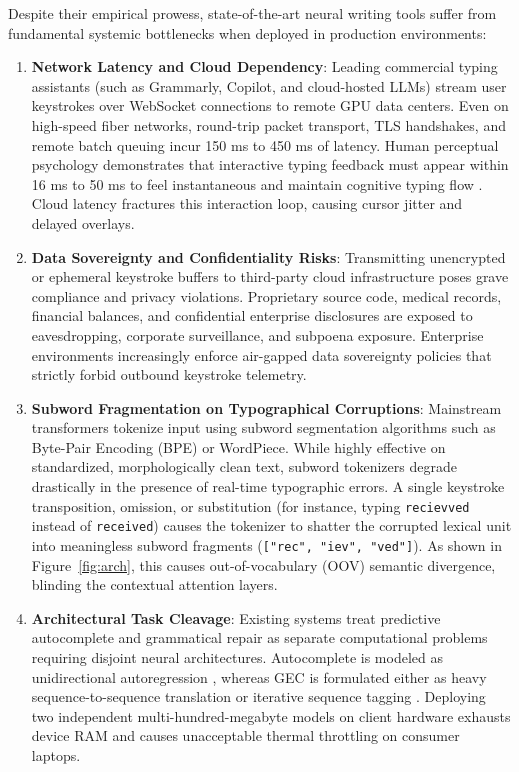 \documentclass[10pt,journal,compsoc]{IEEEtran}
\begin{document}
Despite their empirical prowess, state-of-the-art neural writing tools suffer from fundamental systemic bottlenecks when deployed in production environments:
\begin{enumerate}
    \item \textbf{Network Latency and Cloud Dependency}: Leading commercial typing assistants (such as Grammarly, Copilot, and cloud-hosted LLMs) stream user keystrokes over WebSocket connections to remote GPU data centers. Even on high-speed fiber networks, round-trip packet transport, TLS handshakes, and remote batch queuing incur 150 ms to 450 ms of latency. Human perceptual psychology demonstrates that interactive typing feedback must appear within 16 ms to 50 ms to feel instantaneous and maintain cognitive typing flow \cite{miller1968response}. Cloud latency fractures this interaction loop, causing cursor jitter and delayed overlays.
    \item \textbf{Data Sovereignty and Confidentiality Risks}: Transmitting unencrypted or ephemeral keystroke buffers to third-party cloud infrastructure poses grave compliance and privacy violations. Proprietary source code, medical records, financial balances, and confidential enterprise disclosures are exposed to eavesdropping, corporate surveillance, and subpoena exposure. Enterprise environments increasingly enforce air-gapped data sovereignty policies that strictly forbid outbound keystroke telemetry.
    \item \textbf{Subword Fragmentation on Typographical Corruptions}: Mainstream transformers tokenize input using subword segmentation algorithms such as Byte-Pair Encoding (BPE) \cite{sennrich2016subword} or WordPiece. While highly effective on standardized, morphologically clean text, subword tokenizers degrade drastically in the presence of real-time typographic errors. A single keystroke transposition, omission, or substitution (for instance, typing \texttt{recievved} instead of \texttt{received}) causes the tokenizer to shatter the corrupted lexical unit into meaningless subword fragments (\texttt{["rec", "iev", "ved"]}). As shown in Figure~\ref{fig:arch}, this causes out-of-vocabulary (OOV) semantic divergence, blinding the contextual attention layers.
    \item \textbf{Architectural Task Cleavage}: Existing systems treat predictive autocomplete and grammatical repair as separate computational problems requiring disjoint neural architectures. Autocomplete is modeled as unidirectional autoregression \cite{radford2019language}, whereas GEC is formulated either as heavy sequence-to-sequence translation \cite{raffel2020t5, lewis2020bart} or iterative sequence tagging \cite{omelianchuk2020gector, malmi2019encode, awasthi2019parallel}. Deploying two independent multi-hundred-megabyte models on client hardware exhausts device RAM and causes unacceptable thermal throttling on consumer laptops.
\end{enumerate}
\end{document}
